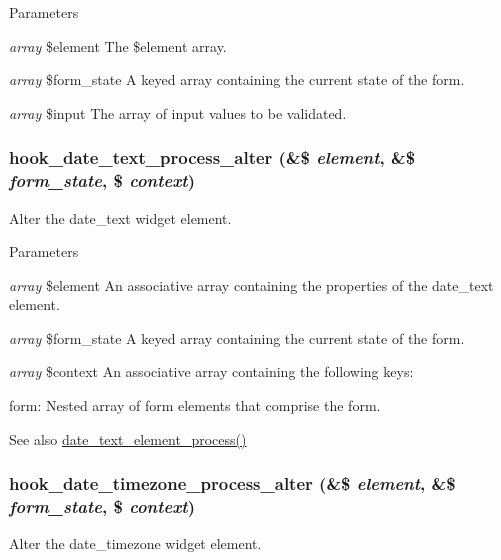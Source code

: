 \begin{DoxyParams}{Parameters}
\item[{\em array}]\$element The \$element array. \item[{\em array}]\$form\_\-state A keyed array containing the current state of the form. \item[{\em array}]\$input The array of input values to be validated. \end{DoxyParams}
\hypertarget{date_8api_8php_ac8d820dc0acb6675634de00189114786}{
\subsubsection[{hook\_\-date\_\-text\_\-process\_\-alter}]{\setlength{\rightskip}{0pt plus 5cm}hook\_\-date\_\-text\_\-process\_\-alter (\&\$ {\em element}, \/  \&\$ {\em form\_\-state}, \/  \$ {\em context})}}
\label{date_8api_8php_ac8d820dc0acb6675634de00189114786}
Alter the date\_\-text widget element.


\begin{DoxyParams}{Parameters}
\item[{\em array}]\$element An associative array containing the properties of the date\_\-text element. \item[{\em array}]\$form\_\-state A keyed array containing the current state of the form. \item[{\em array}]\$context An associative array containing the following keys:
\begin{DoxyItemize}
\item form: Nested array of form elements that comprise the form.
\end{DoxyItemize}\end{DoxyParams}
\begin{DoxySeeAlso}{See also}
\hyperlink{date__api__elements_8inc_ac1b734f1dbb476fe75e096be3dac5d6d}{date\_\-text\_\-element\_\-process()} 
\end{DoxySeeAlso}
\hypertarget{date_8api_8php_a7072a26bebd7c6cbdc660a77a79ef3e2}{
\subsubsection[{hook\_\-date\_\-timezone\_\-process\_\-alter}]{\setlength{\rightskip}{0pt plus 5cm}hook\_\-date\_\-timezone\_\-process\_\-alter (\&\$ {\em element}, \/  \&\$ {\em form\_\-state}, \/  \$ {\em context})}}
\label{date_8api_8php_a7072a26bebd7c6cbdc660a77a79ef3e2}
Alter the date\_\-timezone widget element.


